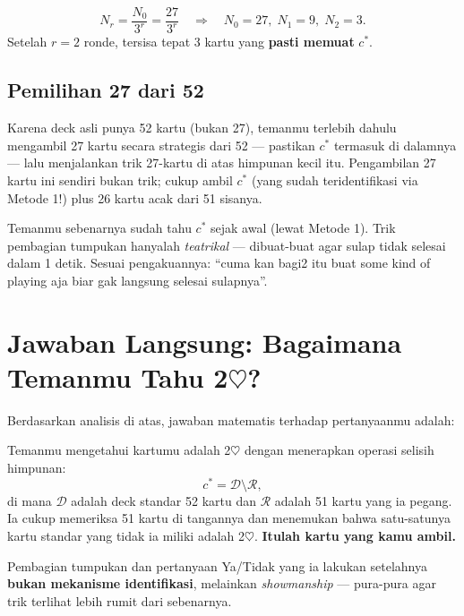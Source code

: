 \documentclass[11pt,a4paper]{article}
\theoremstyle{definition}
\begin{document}
\begin{rumusbox}
\[
N_r = \frac{N_0}{3^r} = \frac{27}{3^r}
\quad \Longrightarrow \quad
N_0 = 27, \; N_1 = 9, \; N_2 = 3.
\]
Setelah $r = 2$ ronde, tersisa tepat 3 kartu yang \textbf{pasti memuat} $c^*$.
\end{rumusbox}

\subsection{Pemilihan 27 dari 52}

Karena deck asli punya 52 kartu (bukan 27), temanmu terlebih dahulu mengambil 27 kartu secara strategis dari 52 --- pastikan $c^*$ termasuk di dalamnya --- lalu menjalankan trik 27-kartu di atas himpunan kecil itu. Pengambilan 27 kartu ini sendiri bukan trik; cukup ambil $c^*$ (yang sudah teridentifikasi via Metode 1!) plus 26 kartu acak dari 51 sisanya.

\begin{insightbox}
Temanmu sebenarnya sudah tahu $c^*$ sejak awal (lewat Metode 1). Trik pembagian tumpukan hanyalah \emph{teatrikal} --- dibuat-buat agar sulap tidak selesai dalam 1 detik. Sesuai pengakuannya: ``cuma kan bagi2 itu buat some kind of playing aja biar gak langsung selesai sulapnya''.
\end{insightbox}

\section{Jawaban Langsung: Bagaimana Temanmu Tahu 2$\heartsuit$?}

Berdasarkan analisis di atas, jawaban matematis terhadap pertanyaanmu adalah:

\begin{tcolorbox}[colback=blue!5, colframe=blue!60!black, fonttitle=\bfseries, title=Jawaban Final]
Temanmu mengetahui kartumu adalah 2$\heartsuit$ dengan menerapkan operasi selisih himpunan:
\[
c^* = \mathcal{D} \setminus \mathcal{R},
\]
di mana $\mathcal{D}$ adalah deck standar 52 kartu dan $\mathcal{R}$ adalah 51 kartu yang ia pegang. Ia cukup memeriksa 51 kartu di tangannya dan menemukan bahwa satu-satunya kartu standar yang tidak ia miliki adalah 2$\heartsuit$. \textbf{Itulah kartu yang kamu ambil.}

Pembagian tumpukan dan pertanyaan Ya/Tidak yang ia lakukan setelahnya \textbf{bukan mekanisme identifikasi}, melainkan \emph{showmanship} --- pura-pura agar trik terlihat lebih rumit dari sebenarnya.
\end{tcolorbox}
\end{document}
